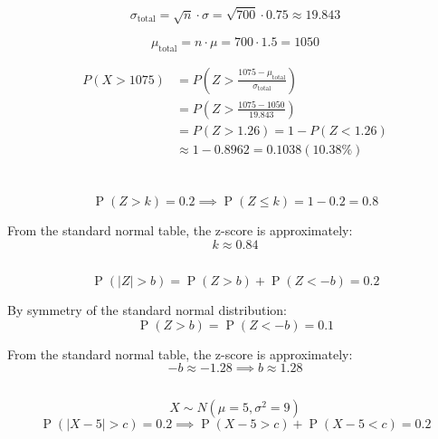 \documentclass{homework}
\begin{document}
\subsection{}

\[
\sigma_{\text{total}} = \sqrt{n} \cdot \sigma = \sqrt{700} \cdot 0.75 \approx 19.843
\]

\[
\mu_{\text{total}} = n \cdot \mu = 700 \cdot 1.5 = 1050
\]

\begin{align*}
    P(X > 1075) &= P\left(Z > \frac{1075 - \mu_{\text{total}}}{\sigma_{\text{total}}}\right) \\
    &= P\left(Z > \frac{1075 - 1050}{19.843}\right) \\
    &= P(Z > 1.26) = 1 - P(Z < 1.26) \\
    &\approx 1 - 0.8962 = 0.1038 (10.38\%)
\end{align*}

\section{}

\subsection{}

\[
\operatorname{P}(Z > k) = 0.2 \implies \operatorname{P}(Z \leq k) = 1 - 0.2 = 0.8
\]

From the standard normal table, the z-score is approximately:
\[
k \approx 0.84
\]

\subsection{}

\[
\operatorname{P}(|Z| > b) = \operatorname{P}(Z > b) + \operatorname{P}(Z < -b) = 0.2
\]

By symmetry of the standard normal distribution:
\[
\operatorname{P}(Z > b) = \operatorname{P}(Z < -b) = 0.1
\]

From the standard normal table, the z-score is approximately:
\[
-b \approx -1.28 \implies b \approx 1.28
\]

\subsection{}

\[
X \sim N(\mu = 5, \sigma^2 = 9)
\]
\[
\operatorname{P}(|X - 5| > c) = 0.2 \implies \operatorname{P}(X - 5 > c) + \operatorname{P}(X - 5 < c) = 0.2
\]
\end{document}

